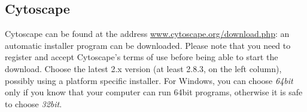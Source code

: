 \subsection{Cytoscape}\label{sec:install-cytoscape}
Cytoscape can be found at the address \url{www.cytoscape.org/download.php}: an automatic installer
program can be downloaded. Please note that you need to register and accept Cytoscape's terms of use
before being able to start the download.
Choose the latest 2.x version (at least 2.8.3, on the left column),
possibly using a platform specific installer. For Windows, you can choose \emph{64bit} only
if you know that your computer can run 64bit programs, otherwise it is safe to choose \emph{32bit}.

